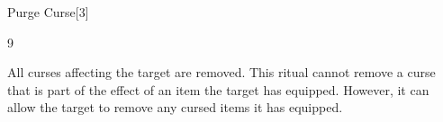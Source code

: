 \begin{spellsection}{Purge Curse}[3]

\begin{spellcontent}

\begin{spelltargetinginfo}


 9
\end{spelltargetinginfo}


\begin{spelleffects}



\spelleffect
All curses affecting the target are removed.
This ritual cannot remove a curse that is part of the effect of an item the target has equipped.
However, it can allow the target to remove any cursed items it has equipped.








\end{spelleffects}

\end{spellcontent}
\begin{spellfooter}


\end{spellfooter}
\begin{spellsubcontent}


\end{spellsubcontent}
\end{spellsection}


